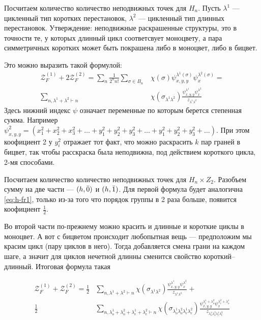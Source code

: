 Посчитаем количество количество неподвижных точек для $H_n$. Пусть $\lambda^1$
--- цикленный тип коротких перестановок, $\lambda^2$ --- цикленный тип длинных
перестановок. Утверждение: неподвижные раскрашенные структуры, это в точности
те, у которых длинный цикл соответсвует моноцвету, а пара симметричных коротких 
может быть покрашена либо в моноцвет, либо в бицвет.

Это можно выразить такой формулой:
\begin{equation}
\label{eq:h-fr1}
\begin{split}
\mathcal Z_F^{(1)} + 2\mathcal Z_F^{(2)} = 
\sum_{n}\frac{1}{2^{n}n!}\sum_{\sigma \in B_n}&\chi(\sigma)
\psi_{x, y, y}^{\lambda^1(\sigma)} \psi_{x}^{\lambda^2(\sigma)} = \\
\sum_{n, \lambda^1 + \lambda^2 \vdash n}&\chi(\sigma_{\lambda^1 \lambda^2})
\frac{\psi_{x, y, y}^{\lambda^1} \psi_{x}^{\lambda^2}}{z_{\lambda^1 \lambda^2}}
\end{split}
\end{equation}
Здесь нижний индекс $\psi$ означает переменные по которым берется степенная
сумма. Например $\psi_{x, y, y}^2 =  (x_1^2 + x_2^2 + x_3^2 + \dots + y_1^2 +
y_2^2 + y_3^2 + \dots + y_1^2 + y_2^2 + y_3^2 + \dots)$. При этом коофициент
2 у $y_i^2$ отражает тот факт, что можно раскрасить $k$ пар граней в бицвет,
так чтобы расскраска была неподвижна, под действием короткого цикла, 2-мя способами.

Посчитаем количество количество неподвижных точек для $H_n \times Z_2$. Разобъем
сумму на две части --- $(h, \Bar 0)$ и $(h, \Bar 1)$. Для первой формула будет
аналогична \ref{eq:h-fr1}, только из-за того что порядок группы в 2 раза больше,
появится коофициент $\frac{1}{2}$.

Во второй части по-прежнему можно красить и длинные и короткие циклы в моноцвет.
А вот с бицветом происходит любопытная вещь --- предположим мы красим цикл (пару
циклов в него). Тогда добавляется смена грани на каждом шаге, а значит для
циклов нечетной длинны сменится свойство короткий--длинный. Итоговая формула
такая 

\begin{equation}
\begin{split}
\mathcal Z_F^{(1)} + \mathcal Z_F^{(2)} = 
\frac{1}{2}&
\sum_{n, \lambda^1 + \lambda^2 \vdash n}\chi(\sigma_{\lambda^1 \lambda^2})
\frac{\psi_{x, y, y}^{\lambda^1} \psi_{x}^{\lambda^2}}{z_{\lambda^1 \lambda^2}}
+ \\
\frac{1}{2}&
\sum_{n, \lambda_o^1 + \lambda_o^2 + \lambda_e^1 + \lambda_e^2 \vdash
n}\chi(\sigma_{\lambda_o^1 \lambda_o^2 \lambda_e^1 \lambda_e^2})
\frac{\psi_{x, y, y}^{\lambda_e^1 + \lambda_o^2} \psi_{x}^{\lambda_e^2 + 
\lambda_o^1}}{z_{\lambda_o^1 \lambda_o^2 \lambda_e^1 \lambda_e^2}}
\end{split}
\end{equation}


